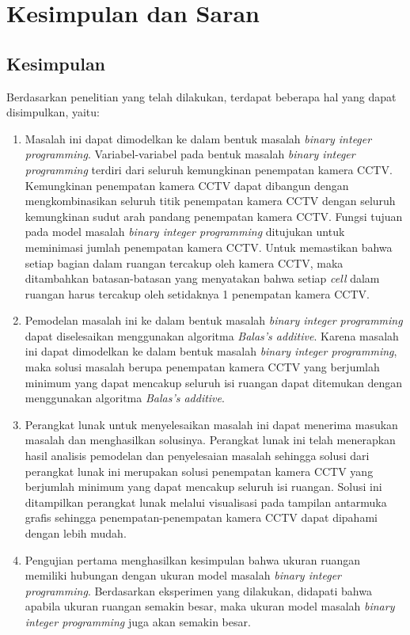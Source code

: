 \chapter{Kesimpulan dan Saran}

\section{Kesimpulan}
Berdasarkan penelitian yang telah dilakukan, terdapat beberapa hal yang dapat disimpulkan, yaitu:
\begin{enumerate}
	\item Masalah ini dapat dimodelkan ke dalam bentuk masalah \textit{binary integer programming}. Variabel-variabel pada bentuk masalah \textit{binary integer programming} terdiri dari seluruh kemungkinan penempatan kamera CCTV. Kemungkinan penempatan kamera CCTV dapat dibangun dengan mengkombinasikan seluruh titik penempatan kamera CCTV dengan seluruh kemungkinan sudut arah pandang penempatan kamera CCTV. Fungsi tujuan pada model masalah \textit{binary integer programming} ditujukan untuk meminimasi jumlah penempatan kamera CCTV. Untuk memastikan bahwa setiap bagian dalam ruangan tercakup oleh kamera CCTV, maka ditambahkan batasan-batasan yang menyatakan bahwa setiap \textit{cell} dalam ruangan harus tercakup oleh setidaknya 1 penempatan kamera CCTV.
	
	\item Pemodelan masalah ini ke dalam bentuk masalah \textit{binary integer programming} dapat diselesaikan menggunakan algoritma \textit{Balas's additive}. Karena masalah ini dapat dimodelkan ke dalam bentuk masalah \textit{binary integer programming}, maka solusi masalah berupa penempatan kamera CCTV yang berjumlah minimum yang dapat mencakup seluruh isi ruangan dapat ditemukan dengan menggunakan algoritma \textit{Balas's additive}.
	
	\item Perangkat lunak untuk menyelesaikan masalah ini dapat menerima masukan masalah dan menghasilkan solusinya. Perangkat lunak ini telah menerapkan hasil analisis pemodelan dan penyelesaian masalah sehingga solusi dari perangkat lunak ini merupakan solusi penempatan kamera CCTV yang berjumlah minimum yang dapat mencakup seluruh isi ruangan. Solusi ini ditampilkan perangkat lunak melalui visualisasi pada tampilan antarmuka grafis sehingga penempatan-penempatan kamera CCTV dapat dipahami dengan lebih mudah.
	
	\item Pengujian pertama menghasilkan kesimpulan bahwa ukuran ruangan memiliki hubungan dengan ukuran model masalah \textit{binary integer programming}. Berdasarkan eksperimen yang dilakukan, didapati bahwa apabila ukuran ruangan semakin besar, maka ukuran model masalah \textit{binary integer programming} juga akan semakin besar.
	

\end{enumerate}
